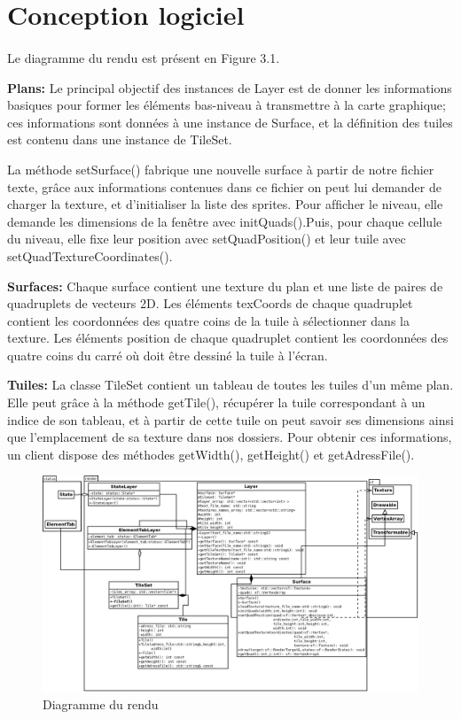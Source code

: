 \documentclass[12pt]{report}
\begin{document}
    
    \section{Conception logiciel}
    \paragraph{} Le diagramme du rendu est présent en Figure 3.1.
    
    \paragraphe{}\textbf{Plans:} Le principal objectif des instances de Layer est de donner les informations basiques pour former les éléments bas-niveau à transmettre à la carte graphique; ces informations sont données à une instance de Surface, et la déﬁnition des tuiles est contenu dans une instance de TileSet. 
    
    \paragraphe{}La méthode setSurface() fabrique une nouvelle surface à partir de notre fichier texte, grâce aux informations contenues dans ce fichier on peut lui demander de charger la texture, et d'initialiser la liste des sprites. Pour afﬁcher le niveau, elle demande les dimensions de la fenêtre avec initQuads().Puis, pour chaque cellule du niveau, elle ﬁxe leur position avec setQuadPosition() et leur tuile avec setQuadTextureCoordinates(). 
    
    \paragraphe{}\textbf{Surfaces:} Chaque surface contient une texture du plan et une liste de paires de quadruplets de vecteurs 2D. Les éléments texCoords de chaque quadruplet contient les coordonnées des quatre coins de la tuile à sélectionner dans la texture. Les éléments position de chaque quadruplet contient les coordonnées des quatre coins du carré où doit être dessiné la tuile à l’écran. 
    
    \paragraphe{}\textbf{Tuiles:} La classe TileSet contient un tableau de toutes les tuiles d’un même plan. Elle peut grâce à la méthode getTile(), récupérer la tuile correspondant à un indice de son tableau, et à partir de cette tuile on peut savoir ses dimensions ainsi que l'emplacement de sa texture dans nos dossiers. Pour obtenir ces informations, un client dispose des méthodes getWidth(), getHeight() et getAdressFile(). 

    
    \newpage
\thispagestyle{empty}
\begin{landscape}
\begin{figure}[h]
    \begin{center}
    \includegraphics[scale=0.50]{render.png}
    \end{center}
    \caption{Diagramme du rendu}
\end{figure}
\end{landscape}
    
\newpage
\end{document}
